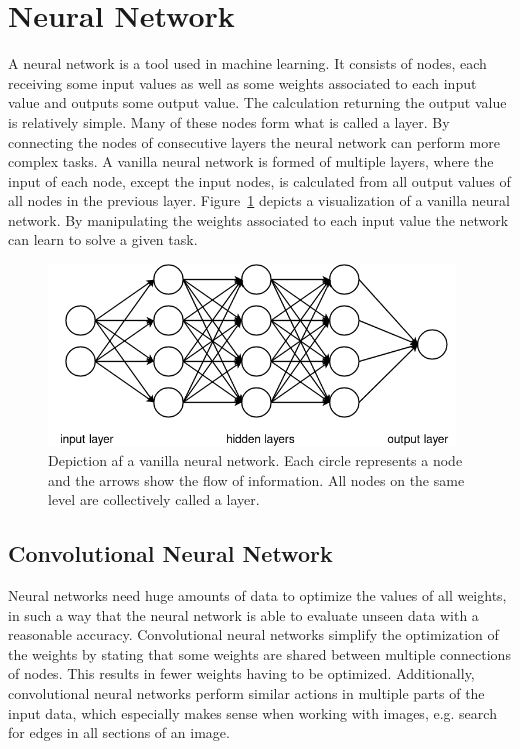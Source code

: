 \section{Neural Network}
A neural network is a tool used in machine learning. It consists of nodes, each receiving some input values as well as some weights associated to each input value and outputs some output value. The calculation returning the output value is relatively simple. Many of these nodes form what is called a layer. By connecting the nodes of consecutive layers the neural network can perform more complex tasks.
A vanilla neural network is formed of multiple layers, where the input of each node, except the input nodes, is calculated from all output values of all nodes in the previous layer.
Figure~\ref{pic:methodology_neuralNetwork_visualizationOfANN} depicts a visualization of a vanilla neural network. By manipulating the weights associated to each input value the network can learn to solve a given task.

\begin{figure}[h!]
	\centering
	\includegraphics[width=4.25in]{img/methodology_neuralNetwork_visualizationOfANN.png}
	\caption{Depiction af a vanilla neural network. Each circle represents a node and the arrows show the flow of information. All nodes on the same level are collectively called a layer.}
	\label{pic:methodology_neuralNetwork_visualizationOfANN}
\end{figure}

\subsection{Convolutional Neural Network}
\label{sec:convolutional_nn}
Neural networks need huge amounts of data to optimize the values of all weights, in such a way that the neural network is able to evaluate unseen data with a reasonable accuracy. Convolutional neural networks simplify the optimization of the weights by stating that some weights are shared between multiple connections of nodes. This results in fewer weights having to be optimized. Additionally, convolutional neural networks perform similar actions in multiple parts of the input data, which especially makes sense when working with images, e.g. search for edges in all sections of an image.


